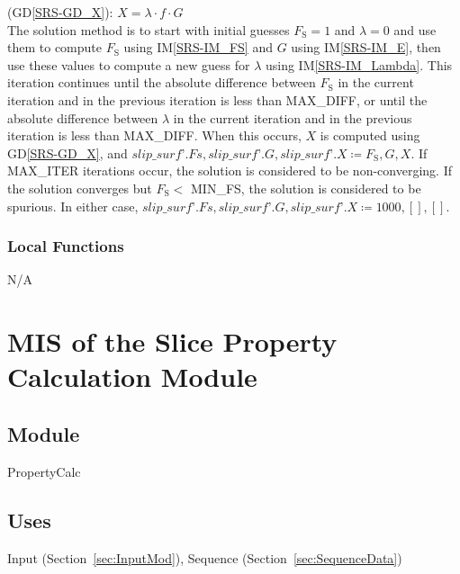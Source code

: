 \documentclass[12pt, titlepage]{article}
\newcommand{\iref}[1]{IM\ref{#1}}
\newcommand{\dref}[1]{GD\ref{#1}}
\begin{document}
\begin{itemize}
\begin{itemize}
		(\dref{SRS-GD_X}): \( X = \lambda \cdot f \cdot G \) \\
		
		The solution method is to start with initial guesses $F_\text{S} = 1$ 
		and $\lambda = 0$ and use them to compute $F_\text{S}$ using 
		\iref{SRS-IM_FS} and $G$ using \iref{SRS-IM_E}, then use these values 
		to compute a new guess for $\lambda$ using \iref{SRS-IM_Lambda}. This 
		iteration continues until the absolute difference between $F_\text{S}$ 
		in the current iteration and in the previous iteration is less than 
		MAX\_DIFF, or until the absolute difference between $\lambda$ in the 
		current iteration and in the previous iteration is less than MAX\_DIFF. 
		When this occurs, $X$ is computed using \dref{SRS-GD_X}, and 
		$\textit{slip\_surf'}.Fs, \textit{slip\_surf'}.G, 
		\textit{slip\_surf'}.X \coloneqq F_\text{S}, G, X$.
		If MAX\_ITER iterations occur, the solution is considered to be 
		non-converging. If the solution converges but $F_\text{S} <$ 
		MIN\_FS, the solution is considered to be spurious. In either case, 
		$\textit{slip\_surf'}.Fs, \textit{slip\_surf'}.G, 
		\textit{slip\_surf'}.X \coloneqq 1000, [], []$.
	\end{itemize}
\end{itemize}

\subsubsection{Local Functions}
N/A


\section{MIS of the Slice Property Calculation Module} \label{sec:PropSortMod}

\subsection{Module} 
PropertyCalc

\subsection{Uses}
Input (Section~\ref{sec:InputMod}), Sequence (Section~\ref{sec:SequenceData})
\end{document}
